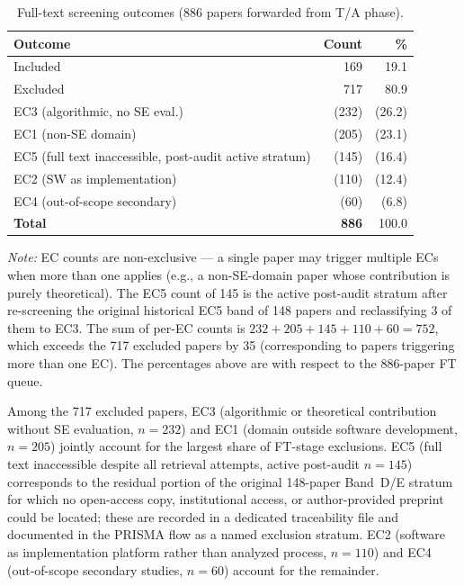 \begin{table}[htbp]
\centering
\caption{Full-text screening outcomes (886 papers forwarded from T/A phase).}
\label{tab:ft-screening}
\small
\setlength{\tabcolsep}{4pt}
\begin{tabular}{lrr}
\toprule
\textbf{Outcome} & \textbf{Count} & \textbf{\%} \\
\midrule
Included                             & 169 & 19.1 \\
Excluded                             & 717 & 80.9 \\
\quad EC3 (algorithmic, no SE eval.) & (232) & (26.2) \\
\quad EC1 (non-SE domain)            & (205) & (23.1) \\
\quad EC5 (full text inaccessible, post-audit active stratum)   & (145) & (16.4) \\
\quad EC2 (SW as implementation)     & (110) & (12.4) \\
\quad EC4 (out-of-scope secondary)   & (60)  & (6.8)  \\
\midrule
\textbf{Total} & \textbf{886} & 100.0 \\
\bottomrule
\end{tabular}

\smallskip
\footnotesize\textit{Note:} EC counts are non-exclusive --- a single paper may
trigger multiple ECs when more than one applies (e.g., a non-SE-domain paper
whose contribution is purely theoretical). The EC5 count of 145 is the active
post-audit stratum after re-screening the original historical EC5 band of 148
papers and reclassifying 3 of them to EC3. The sum of per-EC counts is
$232+205+145+110+60 = 752$, which exceeds the 717 excluded papers by 35
(corresponding to papers triggering more than one EC). The percentages above
are with respect to the 886-paper FT queue.
\end{table}

Among the 717 excluded papers, EC3 (algorithmic or theoretical contribution
without SE evaluation, $n=232$) and EC1 (domain outside software development,
$n=205$) jointly account for the largest share of FT-stage exclusions. EC5
(full text inaccessible despite all retrieval attempts, active post-audit
$n=145$) corresponds to the residual portion of the original 148-paper
Band~D/E stratum for which no open-access copy, institutional access, or
author-provided preprint could be located; these are recorded in a dedicated
traceability file and documented in the PRISMA flow as a named exclusion
stratum. EC2 (software as implementation platform rather than
analyzed process, $n=110$) and EC4 (out-of-scope secondary studies, $n=60$)
account for the remainder.

